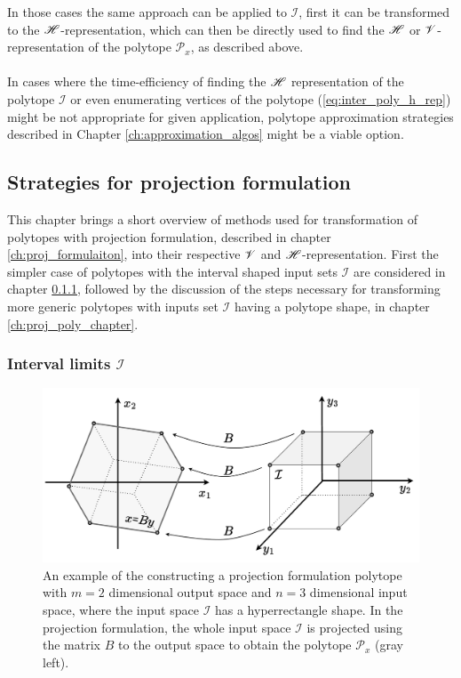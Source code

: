 In those cases the same approach can be applied to $\mathcal{I}$, first it can be transformed to the $\mathscr{H}$-representation, which can then be directly used to find the $\mathscr{H}$ or $\mathscr{V}$-representation of the polytope $\mathcal{P}_x$, as described above.

\paragraph*{} In cases where the time-efficiency of finding the $\mathscr{H}$ representation of the polytope $\mathcal{I}$ or even enumerating vertices of the polytope (\ref{eq:inter_poly_h_rep}) might be not appropriate for given application, polytope approximation strategies described in Chapter \ref{ch:approximation_algos} might be a viable option.

\subsection{Strategies for projection formulation}
\label{ch:projection_algos}

This chapter brings a short overview of methods used for transformation of polytopes with projection formulation, described in chapter \ref{ch:proj_formulaiton}, into their respective $\mathscr{V}$ and $\mathscr{H}$-representation. First the simpler case of polytopes with the interval shaped input sets $\mathcal{I}$ are considered in chapter \ref{ch:proj_inter_chapter}, followed by the discussion of the steps necessary for transforming more generic polytopes with inputs set $\mathcal{I}$ having a polytope shape, in chapter \ref{ch:proj_poly_chapter}.

\subsubsection{Interval limits $\mathcal{I}$}
\label{ch:proj_inter_chapter}
\begin{figure}[!htb]
    \centering
    \includegraphics[width=0.7\linewidth]{Chapters/imgs/projection.pdf}
    \caption{An example of the constructing a projection formulation polytope with $m=2$ dimensional output space and $n=3$ dimensional input space, where the input space $\mathcal{I}$ has a hyperrectangle shape. In the projection formulation, the whole input space $\mathcal{I}$ is projected using the matrix $B$ to the output space to obtain the polytope $\mathcal{P}_x$ (gray left). }
    \label{fig:proj}
\end{figure}

